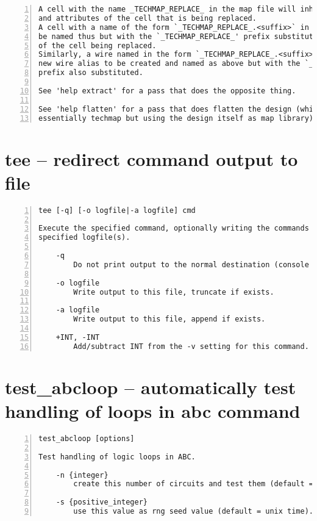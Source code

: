 \begin{lstlisting}[numbers=left,frame=single]
A cell with the name _TECHMAP_REPLACE_ in the map file will inherit the name
and attributes of the cell that is being replaced.
A cell with a name of the form `_TECHMAP_REPLACE_.<suffix>` in the map file will
be named thus but with the `_TECHMAP_REPLACE_' prefix substituted with the name
of the cell being replaced.
Similarly, a wire named in the form `_TECHMAP_REPLACE_.<suffix>` will cause a
new wire alias to be created and named as above but with the `_TECHMAP_REPLACE_'
prefix also substituted.

See 'help extract' for a pass that does the opposite thing.

See 'help flatten' for a pass that does flatten the design (which is
essentially techmap but using the design itself as map library).
\end{lstlisting}

\section{tee -- redirect command output to file}
\label{cmd:tee}
\begin{lstlisting}[numbers=left,frame=single]
    tee [-q] [-o logfile|-a logfile] cmd

Execute the specified command, optionally writing the commands output to the
specified logfile(s).

    -q
        Do not print output to the normal destination (console and/or log file).

    -o logfile
        Write output to this file, truncate if exists.

    -a logfile
        Write output to this file, append if exists.

    +INT, -INT
        Add/subtract INT from the -v setting for this command.
\end{lstlisting}

\section{test\_abcloop -- automatically test handling of loops in abc command}
\label{cmd:test_abcloop}
\begin{lstlisting}[numbers=left,frame=single]
    test_abcloop [options]

Test handling of logic loops in ABC.

    -n {integer}
        create this number of circuits and test them (default = 100).

    -s {positive_integer}
        use this value as rng seed value (default = unix time).
\end{lstlisting}

